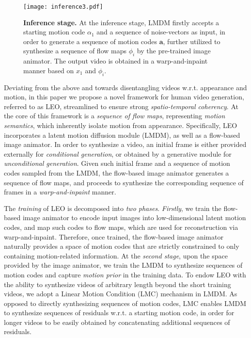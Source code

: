 {\begin{figure}[t!]
\centering
\texttt{[image: inference3.pdf]}
\caption{\textbf{Inference stage.} At the inference stage, LMDM firstly accepts a starting motion code $\alpha_1$ and a sequence of noise-vectors as input, in order to generate a sequence of motion codes $\mathbf{a}$, further utilized to synthesize a sequence of flow maps $\phi_i$ by the pre-trained image animator. The output video is obtained in a warp-and-inpaint manner based on $x_1$ and $\phi_i$.}
\label{fig:inference}
\end{figure}

Deviating from the above and towards disentangling videos w.r.t. appearance and motion,
in this paper we propose a novel framework for human video generation, referred to as LEO, streamlined to ensure strong \textit{spatio-temporal coherency}.
At the core of this framework is a \textit{sequence of flow maps}, representing \textit{motion semantics},
which inherently isolate motion from appearance.
Specifically, LEO incorporates a latent motion diffusion module (LMDM), as well as a flow-based image animator.
In order to synthesize a video, an initial frame is either provided externally for \textit{conditional generation},
or obtained by a generative module for \textit{unconditional generation}.
Given such initial frame and a sequence of motion codes sampled from the LMDM, the flow-based image animator generates a sequence of flow maps, and proceeds to synthesize the corresponding sequence of frames in a \textit{warp-and-inpaint} manner.

The \textit{training} of LEO is decomposed into \textit{two phases}. \textit{Firstly}, we train the flow-based image animator to encode input images into low-dimensional latent motion codes,
and map such codes to flow maps, which are used for reconstruction via warp-and-inpaint.
Therefore, once trained, 
the flow-based image animator naturally provides a space of motion codes that are strictly constrained to only containing motion-related information.
At the \textit{second stage},
upon the space provided by the image animator,
we train the LMDM to synthesize sequences of motion codes and capture \textit{motion prior} in the training data.
To endow LEO with the ability to synthesize videos of arbitrary length beyond the short training videos,
we adopt a Linear Motion Condition (LMC) mechanism
in LMDM. As opposed to directly synthesizing sequences of motion codes,
LMC enables LMDM to synthesize sequences of residuals w.r.t. a starting motion code,
in order for longer videos to be easily obtained by concatenating additional sequences of residuals.

}
